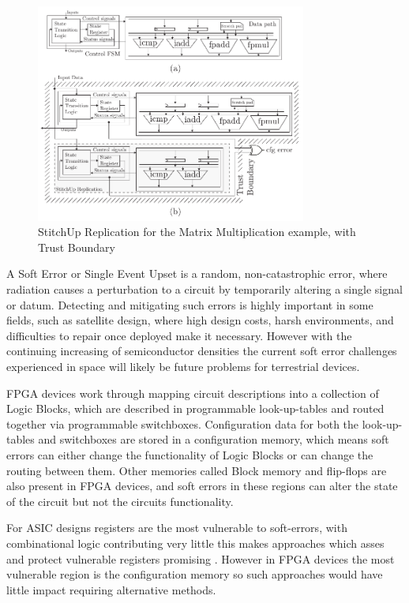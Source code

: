 \begin{figure}[t]
\centering
\includegraphics[width=3.5in]{./imgs/StitchUpReplication.pdf}
\caption{StitchUp Replication for the Matrix Multiplication example, with Trust Boundary}
\label{fig:HLSArch}
\end{figure}

A Soft Error or Single Event Upset is a random, non-catastrophic error, where radiation causes
a perturbation to a circuit by temporarily altering a single signal or datum.
Detecting and mitigating such errors is highly important in some fields, such as satellite design, 
where high design costs, harsh environments, and difficulties to repair once deployed make it necessary. 
However with the continuing increasing of semiconductor densities the current soft error
challenges experienced in space will likely be future problems for terrestrial devices\cite{normand1996single}\cite{henkel2013reliable}.

FPGA devices work through mapping circuit descriptions into a collection of Logic Blocks,
which are described in programmable look-up-tables and routed together via
programmable switchboxes.
Configuration data for both the look-up-tables and switchboxes are stored in a
configuration memory, which means soft errors can either change the functionality
of Logic Blocks or can change the routing between them.
Other memories called Block memory and flip-flops are also present in FPGA devices,
and soft errors in these regions can alter the state of the circuit but not the
circuits functionality.

For ASIC designs registers are the most vulnerable to soft-errors, with
combinational logic contributing very little \cite{baumann2005soft} this makes
approaches which asses and protect vulnerable registers promising \cite{chen2014reliability}.
However in FPGA devices the most vulnerable region is the configuration memory
so such approaches would have little impact requiring alternative methods.


